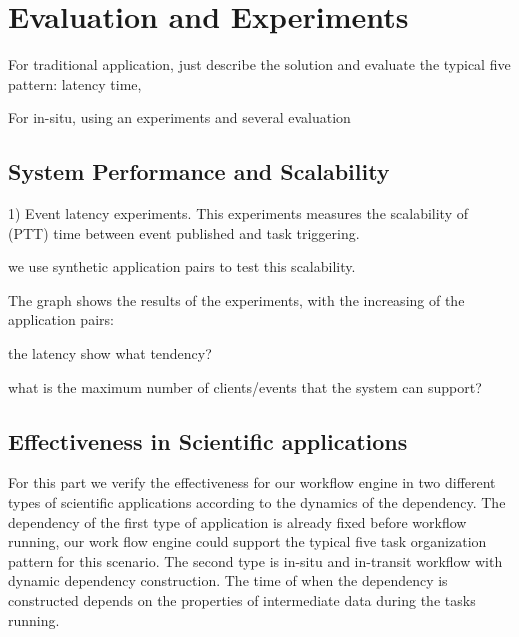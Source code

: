 \section{Evaluation and Experiments}
For traditional application, just describe the solution and evaluate the typical five pattern: latency time, 

For in-situ, using an experiments and several evaluation


\subsection{System Performance and Scalability}
1) Event latency experiments. This experiments measures the scalability of (PTT) time between event published and task triggering. 

we use synthetic application pairs to test this scalability.


The graph shows the results of the experiments, with the increasing of the application pairs:

the latency show what tendency?

what is the maximum number of clients/events that the system can support?

\subsection{Effectiveness in Scientific applications}
For this part we verify the effectiveness for our workflow engine in two different types of scientific applications according to the dynamics of the dependency. The dependency of the first type of application is already fixed before workflow running, our work flow engine could support the typical five task organization pattern \cite{todo} for this scenario. The second type is in-situ and in-transit workflow with dynamic dependency construction. The time of when the dependency is constructed depends on the properties of intermediate data during the tasks running.

